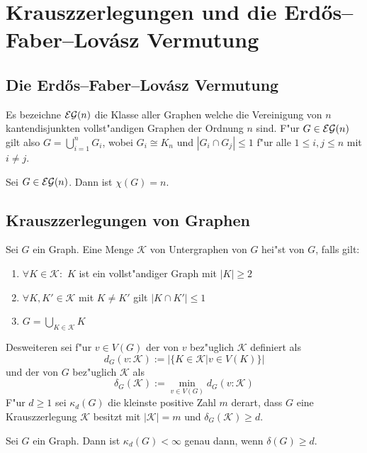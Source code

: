 \section{Krauszzerlegungen und die Erd\H{o}s--Faber--Lov\'asz Vermutung}
\subsection{Die Erd\H{o}s--Faber--Lov\'asz Vermutung}
\label{sec:EFL-Vermutung}
Es bezeichne ${\cal EG}(n)$ die Klasse aller Graphen welche die Vereinigung von $n$ kantendisjunkten vollst"andigen Graphen der Ordnung $n$ sind. F"ur $G\in{\cal EG}(n)$ gilt also $G= \bigcup\limits_{i=1}^{n} G_i$, wobei $G_i \cong K_n$ und $|G_i \cap G_j| \leq 1$ f"ur alle $1\leq i,j \leq n$ mit $i\neq j$. 
\begin{conjecture}
  Sei $G\in{\cal EG}(n)$. Dann ist $\chi(G) = n$.
  \label{con:efl}
\end{conjecture}

\subsection{Krauszzerlegungen von Graphen}
\label{ssec:Krauszzerlegung}
\begin{definition}
  \label{def:Krauszzerlegung}
  Sei $G$ ein Graph. Eine Menge $\mathcal K$ von Untergraphen von $G$ hei"st  von $G$, falls gilt:
  \begin{enumerate}[label=(\roman*)]
    \item $\forall K \in \mathcal K:$ $K$ ist ein vollst"andiger Graph mit $|K| \geq 2$
    \item $\forall K, K'\in \mathcal K$ mit $K\neq K'$ gilt $|K\cap K'| \leq 1$
    \item $G=\bigcup\limits_{K\in \mathcal K}K$
  \end{enumerate}
  Desweiteren sei f"ur $v\in V(G)$ der  von $v$ bez"uglich $\mathcal K$ definiert als $$d_G(v:\mathcal K) := |\{ K\in\mathcal K| v \in V(K)\}|$$ und der  von $G$ bez"uglich $\mathcal K$ als $$\delta_G(\mathcal K) := \min\limits_{v\in V(G)}d_G(v:\mathcal K)$$ 
  F"ur $d \geq 1$ sei $\kappa_d(G)$ die kleinste positive Zahl $m$ derart, dass $G$ eine Krauszzerlegung $\mathcal K$ besitzt mit $|\mathcal K| = m$ und $\delta_G(\mathcal K) \geq d$.
\end{definition}
\begin{lemma}
  Sei $G$ ein Graph. Dann ist $\kappa_d(G) < \infty$ genau dann, wenn $\delta(G) \geq d$.
  \label{lm:krauszexistenz}
\end{lemma}

